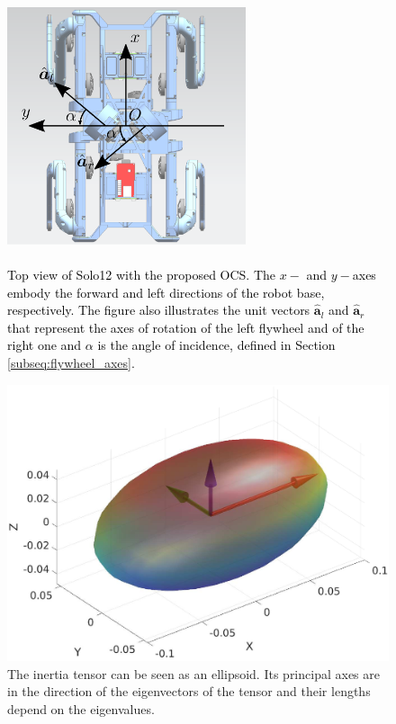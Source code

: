 \documentclass[sensors,article,accept,pdftex,moreauthors]{Definitions/mdpi}
\newcommand{\MF}[1]{\textcolor{black}{#1}}
\begin{document}
\begin{figure}[H]%
 
	\includegraphics[width=7cm,height=8cm,keepaspectratio]{figures/axes.eps}
 
	\caption{\MF{Top view of Solo12 with the proposed OCS. The $x-$ and $y-$axes embody the forward and left directions of the robot base, respectively. The figure also illustrates the unit vectors $\hat{\bm{a}}_l$ and $\hat{\bm{a}}_r$  that represent the axes of rotation of the left flywheel and of the right one and $\alpha$ is the angle of incidence, defined in Section \ref{subseq:flywheel_axes}.}}
	\label{fig:axes}
\end{figure}
\vspace{-11pt}
\begin{figure}[H]%
 \hspace{-16pt}
	\includegraphics[width=1\linewidth]{figures/inertiaEllipsoid.eps}
	\vspace{-9pt}
	\caption{The %
 inertia tensor can be seen as an ellipsoid. Its principal axes are in the direction of the eigenvectors of the tensor and their lengths depend on the eigenvalues.}
	\label{fig:ellipsoid}
\end{figure}
\end{document}
